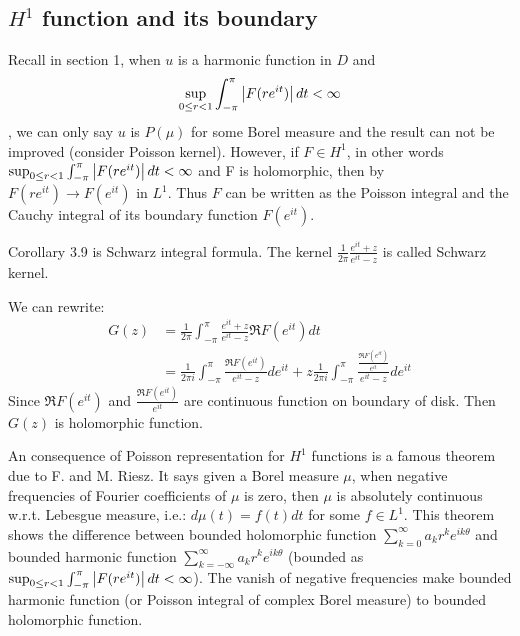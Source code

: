 \subsection{$H^1$ function and its boundary}
Recall in section 1, when $u$ is a harmonic function in $D$ and
\begin{equation*}
    \sup_{0\leq r<1}{\int_{-\pi}^{\pi}\left\lvert F(re^{i t})\right\rvert d t}<\infty
\end{equation*},
we can only say $u$ is $P(\mu)$ for some Borel measure and the result can not be improved (consider Poisson kernel). However, if $F\in H^1$,
in other words $\sup_{0\leq r<1}{\int_{-\pi}^{\pi}\left\lvert F(re^{i t})\right\rvert d t}<\infty$ and F is holomorphic,
then by $F(re^{it})\to F(e^{it})$ in $L^1$. Thus $F$ can be written as the Poisson integral and the Cauchy integral of its boundary function $F(e^{it})$.\par
\begin{remark}
    Corollary 3.9 is Schwarz integral formula. The kernel $\frac{1}{2\pi}\frac{e^{it}+z}{e^{it}-z}$ is called Schwarz kernel.\par
    {\color{blue} We can rewrite:
        \begin{align*}
            G(z) & =\frac{1}{2\pi}\int_{-\pi}^\pi{\frac{e^{it}+z}{e^{it}-z}\Re{F(e^{it})}d t}                                                                                        \\
                 & =\frac{1}{2\pi i}\int_{-\pi}^\pi{\frac{\Re{F(e^{it})}}{e^{it}-z}d e^{it}}+z\frac{1}{2\pi i}\int_{-\pi}^\pi{\frac{\frac{\Re{F(e^{it})}}{e^{it}}}{e^{it}-z}de^{it}}
        \end{align*}
        Since $\Re{F(e^{it})}$ and $\frac{\Re{F(e^{it})}}{e^{it}}$ are continuous function on boundary of disk. Then $G(z)$ is holomorphic function}.
\end{remark}
An consequence of Poisson representation for $H^1$ functions is a famous theorem due to F. and M. Riesz. It says given a Borel measure $\mu$,
when negative frequencies of Fourier coefficients of $\mu$ is zero, then $\mu$ is absolutely continuous w.r.t. Lebesgue measure, i.e.:
$d\mu(t)=f(t)d t$ for some $f\in L^1$. This theorem shows the difference between bounded holomorphic function $\sum_{k=0}^\infty{a_kr^{k}e^{i k\theta}}$ and
bounded harmonic function $\sum_{k=-\infty}^\infty{a_kr^{k}e^{i k\theta}}$ (bounded as $\sup_{0\leq r<1}{\int_{-\pi}^{\pi}\left\lvert F(re^{i t})\right\rvert d t}<\infty$).
The vanish of negative frequencies make bounded harmonic function (or Poisson integral of complex Borel measure) to bounded holomorphic function.\par
